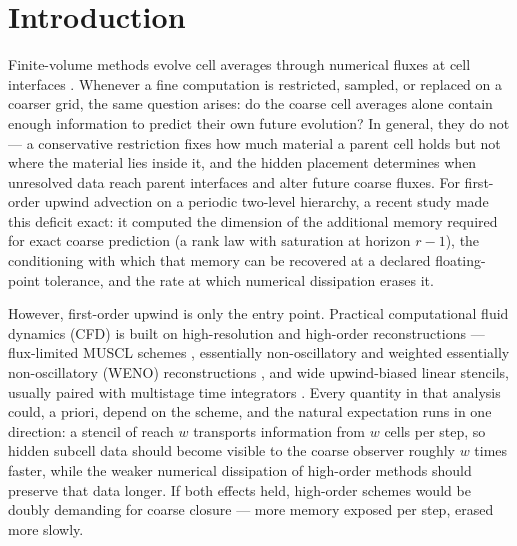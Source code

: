 \documentclass[pdflatex,sn-mathphys-num]{sn-jnl}%
\theoremstyle{thmstyleone}%
\theoremstyle{thmstyletwo}%
\theoremstyle{thmstylethree}%
\begin{document}


\maketitle

\section{Introduction}\label{sec:intro}

Finite-volume methods evolve cell averages through numerical fluxes at cell interfaces \cite{LeVeque2002,Toro2009,DrikakisRider2005}.
Whenever a fine computation is restricted, sampled, or replaced on a coarser grid, the same question arises: do the coarse cell averages alone contain enough information to predict their own future evolution?
In general, they do not --- a conservative restriction fixes how much material a parent cell holds but not where the material lies inside it, and the hidden placement determines when unresolved data reach parent interfaces and alter future coarse fluxes.
For first-order upwind advection on a periodic two-level hierarchy, a recent study \cite{PolemitisChristakisDrikakis2026FVerasure} made this deficit exact: it computed the dimension of the additional memory required for exact coarse prediction (a rank law with saturation at horizon $r-1$), the conditioning with which that memory can be recovered at a declared floating-point tolerance, and the rate at which numerical dissipation erases it.

However, first-order upwind is only the entry point.
Practical computational fluid dynamics (CFD) is built on high-resolution and high-order reconstructions --- flux-limited MUSCL schemes \cite{vanLeer1979,Harten1983,Sweby1984}, essentially non-oscillatory and weighted essentially non-oscillatory (WENO) reconstructions \cite{LiuOsherChan1994,JiangShu1996,Shu1998}, and wide upwind-biased linear stencils, usually paired with multistage time integrators \cite{GottliebShuTadmor2001}.
Every quantity in that analysis could, a priori, depend on the scheme, and the natural expectation runs in one direction: a stencil of reach $w$ transports information from $w$ cells per step, so hidden subcell data should become visible to the coarse observer roughly $w$ times faster, while the weaker numerical dissipation of high-order methods \cite{WarmingHyett1974,MargolinRider2002} should preserve that data longer.
If both effects held, high-order schemes would be doubly demanding for coarse closure --- more memory exposed per step, erased more slowly.
\end{document}
